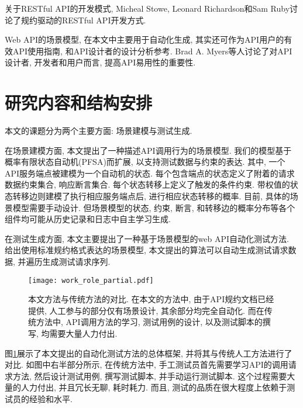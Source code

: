     	关于RESTful API的开发模式, Micheal Stowe\cite{michaels15}, Leonard Richardson和Sam Ruby\cite{leonardr07}讨论了规约驱动的RESTful API开发方式.
    	
    	Web API的场景模型, 在本文中主要用于自动化生成, 其实还可作为API用户的有效API使用指南, 和API设计者的设计分析参考. Brad A. Myers等人\cite{bradm17}讨论了对API设计者, 开发者和用户而言, 提高API易用性的重要性.

	\section{研究内容和结构安排}
	
	    本文的课题分为两个主要方面: 场景建模与测试生成.
	
	    在场景建模方面, 本文提出了一种描述API调用行为的场景模型. 我们的模型基于概率有限状态自动机(PFSA)而扩展, 以支持测试数据与约束的表达. 其中, 一个API服务端点被建模为一个自动机的状态. 每个包含端点的状态定义了附着的请求数据约束集合, 响应断言集合. 每个状态转移上定义了触发的条件约束. 带权值的状态转移边则建模了执行相应服务端点后, 进行相应状态转移的概率. 目前, 具体的场景模型需要手动设计. 但场景模型的状态, 约束, 断言, 和转移边的概率分布等各个组件均可能从历史记录和日志中自主学习生成.
	
        在测试生成方面, 本文主要提出了一种基于场景模型的web API自动化测试方法. 给出使用标准规约格式表达的场景模型, 本文提出的算法可以自动生成测试请求数据, 并遍历生成测试请求序列.
        
        \begin{figure}[htbp]
            \centering
            \texttt{[image: work\_role\_partial.pdf]}
            \caption{本文方法与传统方法的对比. 在本文的方法中, 由于API规约文档已经提供, 人工参与的部分仅有场景设计, 其余部分均完全自动化. 而在传统方法中, API调用方法的学习, 测试用例的设计, 以及测试脚本的撰写, 均需要大量人力付出.}
            \label{fig:overview}
        \end{figure}
        
        图\ref{fig:overview}展示了本文提出的自动化测试方法的总体框架, 并将其与传统人工方法进行了对比. 如图中右半部分所示, 在传统方法中, 手工测试员首先需要学习API的调用请求方法, 然后设计测试用例, 撰写测试脚本, 并手动运行测试脚本. 这个过程需要大量的人力付出, 并且冗长无聊, 耗时耗力. 而且, 测试的品质在很大程度上依赖于测试员的经验和水平.
        
